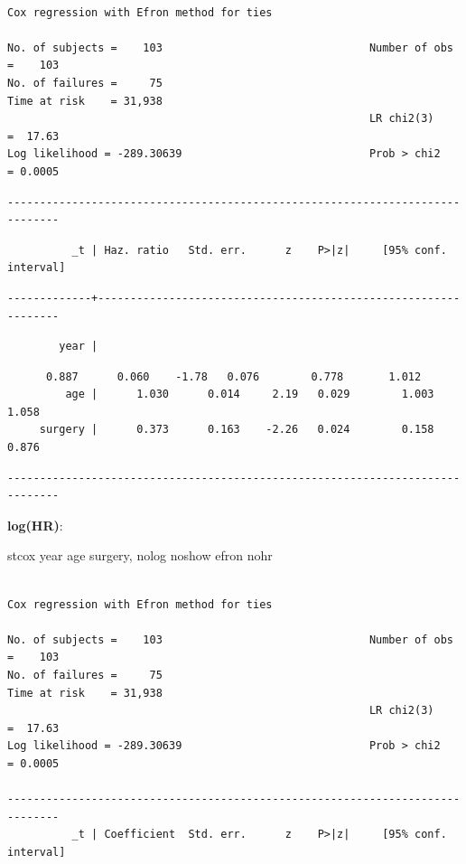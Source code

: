 \documentclass[
  12pt,
  letterpaper,
  DIV=11,
  numbers=noendperiod,
  onepage,
  openany]{scrreprt}
\newenvironment{Shaded}{\begin{snugshade}}{\end{snugshade}}
\newcommand{\FunctionTok}[1]{\textcolor[rgb]{0.94,0.94,0.56}{#1}}
\newcommand{\KeywordTok}[1]{\textcolor[rgb]{0.94,0.87,0.69}{#1}}
\newcommand{\NormalTok}[1]{\textcolor[rgb]{0.80,0.80,0.80}{#1}}
\begin{document}
\begin{verbatim}

Cox regression with Efron method for ties

No. of subjects =    103                                Number of obs =    103
No. of failures =     75
Time at risk    = 31,938
                                                        LR chi2(3)    =  17.63
Log likelihood = -289.30639                             Prob > chi2   = 0.0005
\end{verbatim}

\begin{verbatim}
------------------------------------------------------------------------------
\end{verbatim}

\begin{verbatim}
          _t | Haz. ratio   Std. err.      z    P>|z|     [95% conf. interval]
\end{verbatim}

\begin{verbatim}
-------------+----------------------------------------------------------------
\end{verbatim}

\begin{verbatim}
        year |
\end{verbatim}

\begin{verbatim}
      0.887      0.060    -1.78   0.076        0.778       1.012
         age |      1.030      0.014     2.19   0.029        1.003       1.058
     surgery |      0.373      0.163    -2.26   0.024        0.158       0.876
\end{verbatim}

\begin{verbatim}
------------------------------------------------------------------------------
\end{verbatim}

\textbf{log(HR)}:

\begin{Shaded}
\begin{Highlighting}[]
\KeywordTok{stcox} \FunctionTok{year}\NormalTok{ age surgery, }\KeywordTok{nolog}\NormalTok{ noshow efron nohr}
\end{Highlighting}
\end{Shaded}

\begin{verbatim}

Cox regression with Efron method for ties

No. of subjects =    103                                Number of obs =    103
No. of failures =     75
Time at risk    = 31,938
                                                        LR chi2(3)    =  17.63
Log likelihood = -289.30639                             Prob > chi2   = 0.0005

------------------------------------------------------------------------------
          _t | Coefficient  Std. err.      z    P>|z|     [95% conf. interval]
\end{verbatim}
\end{document}
